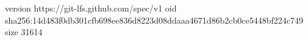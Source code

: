 version https://git-lfs.github.com/spec/v1
oid sha256:14d483f0db301cfb698ee836d8223d08ddaaa4671d86b2cb0ce5448bf224c749
size 31614
